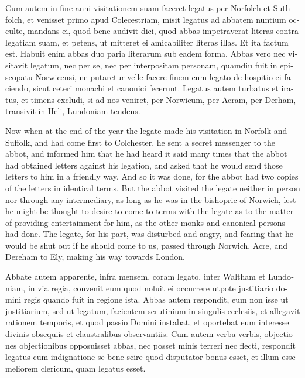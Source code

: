 \documentclass{book}
\begin{document}
\begin{paracol}{2}
\switchcolumn*

\begin{otherlanguage}{latin}
Cum autem in fine anni visitationem suam faceret legatus per Norfolch et Suthfolch, et venisset primo apud Colecestriam, misit legatus ad abbatem nuntium occulte, mandans ei, quod bene audivit dici, quod abbas impetraverat literas contra legatiam suam, et petens, ut mitteret ei amicabiliter literas illas. Et ita factum est. Habuit enim abbas duo paria literarum sub eadem forma. Abbas vero nec visitavit legatum, nec per se, nec per interpositam personam, quamdiu fuit in episcopatu Norwicensi, ne putaretur velle facere finem cum legato de hospitio ei faciendo, sicut ceteri monachi et canonici fecerunt. Legatus autem turbatus et iratus, et timens excludi, si ad nos veniret, per Norwicum, per Acram, per Derham, transivit in Heli, Lundoniam tendens. 
\end{otherlanguage}

\switchcolumn

Now when at the end of the year the legate made his visitation in Norfolk and Suffolk, and had come first to Colchester, he sent a secret messenger to the abbot, and informed him that he had heard it said many times that the abbot had obtained letters against his legation, and asked that he would send those letters to him in a friendly way. And so it was done, for the abbot had two copies of the letters in identical terms. But the abbot visited the legate neither in person nor through any intermediary, as long as he was in the bishopric of Norwich, lest he might be thought to desire to come to terms with the legate as to the matter of providing entertainment for him, as the other monks and canonical persons had done. The legate, for his part, was disturbed and angry, and fearing that he would be shut out if he should come to us, passed through Norwich, Acre, and Dereham to Ely, making his way towards London.

\switchcolumn*

\begin{otherlanguage}{latin}
Abbate autem apparente, infra mensem, coram legato, inter Waltham et Lundoniam, in via regia, convenit eum quod noluit ei occurrere utpote justitiario domini regis quando fuit in regione ista. Abbas autem respondit, eum non isse ut justitiarium, sed ut legatum, facientem scrutinium in singulis ecclesiis, et allegavit rationem temporis, et quod passio Domini instabat, et oportebat eum interesse divinis obsequiis et claustralibus observantiis. Cum autem verba verbis, objectiones objectionibus opposuisset abbas, nec posset minis terreri nec flecti, respondit legatus cum indignatione se bene scire quod disputator bonus esset, et illum esse meliorem clericum, quam legatus esset.
\end{otherlanguage}


\end{paracol}
\end{document}
